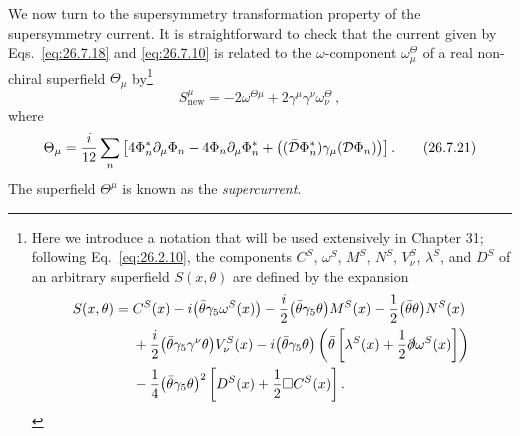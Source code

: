 We now turn to the supersymmetry transformation property of the
supersymmetry current. It is straightforward to check that the current given
by Eqs.~\eqref{eq:26.7.18} and \eqref{eq:26.7.10} is related to the
\(\omega\)-component \(\omega_\mu^\Theta\) of a real non-chiral superfield
\(\Theta_\mu\) by\footnote{Here we introduce a notation that will be used
extensively in Chapter 31; following Eq.~\eqref{eq:26.2.10}, the components
\(C^S\), \(\omega^S\), \(M^S\), \(N^S\), \(V_\nu^S\), \(\lambda^S\), and
\(D^S\) of an arbitrary superfield \(S(x,\theta)\) are defined by the
expansion
\[
  \begin{aligned}
  S(x,\theta)={}&C^S(x)-i\bigl(\bar\theta\gamma_5\omega^S(x)\bigr)
  -\frac{i}{2}\bigl(\bar\theta\gamma_5\theta\bigr)M^S(x)
  -\frac12\bigl(\bar\theta\theta\bigr)N^S(x)
  \\
  &+\frac{i}{2}\bigl(\bar\theta\gamma_5\gamma^\nu\theta\bigr)V_\nu^S(x)
  -i\bigl(\bar\theta\gamma_5\theta\bigr)
   \left(
    \bar\theta\left[\lambda^S(x)+\frac12\sl{\partial}\omega^S(x)\right]
   \right)
  \\
  &-\frac14\bigl(\bar\theta\gamma_5\theta\bigr)^2
   \left[D^S(x)+\frac12\Box C^S(x)\right].
  \end{aligned}
\]}
\begin{equation}
  S_{\mathrm{new}}^\mu
  =-2\omega^{\Theta\mu}
   +2\gamma^\mu\gamma^\nu\omega_\nu^\Theta\,,
  \tag{26.7.20}\label{eq:26.7.20}
\end{equation}
where
\begin{equation}
  \Theta_\mu
  =\frac{i}{12}\sum_n\left[
    4\Phi_n^*\partial_\mu\Phi_n
    -4\Phi_n\partial_\mu\Phi_n^*
    +\bigl((\bar{\SuperD}\Phi_n^*)\gamma_\mu(\SuperD\Phi_n)\bigr)
  \right].
  \tag{26.7.21}\label{eq:26.7.21}
\end{equation}
The superfield \(\Theta^\mu\) is known as the \emph{supercurrent}.

